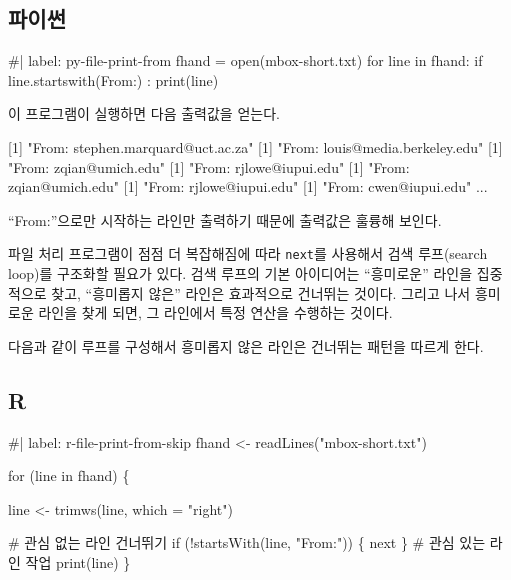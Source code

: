 \documentclass[
  letterpaper,
]{book}
\newenvironment{Shaded}{\begin{snugshade}}{\end{snugshade}}
\newcommand{\DecValTok}[1]{\textcolor[rgb]{0.68,0.00,0.00}{#1}}
\newcommand{\NormalTok}[1]{\textcolor[rgb]{0.00,0.23,0.31}{#1}}
\newcommand{\StringTok}[1]{\textcolor[rgb]{0.13,0.47,0.30}{#1}}
\begin{document}
\subsection{파이썬}

\begin{Shaded}
\begin{Highlighting}[]
\NormalTok{\#| label: py{-}file{-}print{-}from}
\NormalTok{fhand = open(\textquotesingle{}mbox{-}short.txt\textquotesingle{})}
\NormalTok{for line in fhand:}
\NormalTok{    if line.startswith(\textquotesingle{}From:\textquotesingle{}) :}
\NormalTok{        print(line)}
\end{Highlighting}
\end{Shaded}

이 프로그램이 실행하면 다음 출력값을 얻는다.

\begin{Shaded}
\begin{Highlighting}[]
\NormalTok{[}\DecValTok{1}\NormalTok{] }\StringTok{"From: stephen.marquard@uct.ac.za"}
\NormalTok{[}\DecValTok{1}\NormalTok{] }\StringTok{"From: louis@media.berkeley.edu"}
\NormalTok{[}\DecValTok{1}\NormalTok{] }\StringTok{"From: zqian@umich.edu"}
\NormalTok{[}\DecValTok{1}\NormalTok{] }\StringTok{"From: rjlowe@iupui.edu"}
\NormalTok{[}\DecValTok{1}\NormalTok{] }\StringTok{"From: zqian@umich.edu"}
\NormalTok{[}\DecValTok{1}\NormalTok{] }\StringTok{"From: rjlowe@iupui.edu"}
\NormalTok{[}\DecValTok{1}\NormalTok{] }\StringTok{"From: cwen@iupui.edu"}
\NormalTok{...}
\end{Highlighting}
\end{Shaded}

``From:''으로만 시작하는 라인만 출력하기 때문에 출력값은 훌륭해 보인다.

파일 처리 프로그램이 점점 더 복잡해짐에 따라 \texttt{next}를 사용해서
검색 루프(search loop)를 구조화할 필요가 있다. 검색 루프의 기본
아이디어는 ``흥미로운'' 라인을 집중적으로 찾고, ``흥미롭지 않은'' 라인은
효과적으로 건너뛰는 것이다. 그리고 나서 흥미로운 라인을 찾게 되면, 그
라인에서 특정 연산을 수행하는 것이다.

다음과 같이 루프를 구성해서 흥미롭지 않은 라인은 건너뛰는 패턴을 따르게
한다.

\subsection{R}

\begin{Shaded}
\begin{Highlighting}[]
\NormalTok{\#| label: r{-}file{-}print{-}from{-}skip}
\NormalTok{fhand \textless{}{-} readLines("mbox{-}short.txt")}

\NormalTok{for (line in fhand) \{}

\NormalTok{  line \textless{}{-} trimws(line, which = "right")}

\NormalTok{  \# 관심 없는 라인 건너뛰기}
\NormalTok{  if (!startsWith(line, "From:")) \{}
\NormalTok{    next}
\NormalTok{  \}}
\NormalTok{  \# 관심 있는 라인 작업}
\NormalTok{  print(line)}
\NormalTok{\}}
\end{Highlighting}
\end{Shaded}
\end{document}
